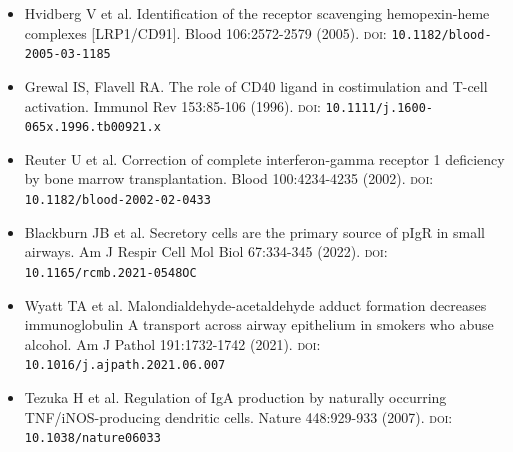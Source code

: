\documentclass[10pt]{article}
\begin{document}
{\begin{itemize}[leftmargin=2.2em,itemsep=1pt,topsep=2pt]
\item[12.] Hvidberg V et al. Identification of the receptor scavenging hemopexin-heme complexes [LRP1/CD91]. Blood 106:2572-2579 (2005). \textsc{doi}: \texttt{10.1182/blood-2005-03-1185}
\item[13.] Grewal IS, Flavell RA. The role of CD40 ligand in costimulation and T-cell activation. Immunol Rev 153:85-106 (1996). \textsc{doi}: \texttt{10.1111/j.1600-065x.1996.tb00921.x}
\item[14.] Reuter U et al. Correction of complete interferon-gamma receptor 1 deficiency by bone marrow transplantation. Blood 100:4234-4235 (2002). \textsc{doi}: \texttt{10.1182/blood-2002-02-0433}
\item[15.] Blackburn JB et al. Secretory cells are the primary source of pIgR in small airways. Am J Respir Cell Mol Biol 67:334-345 (2022). \textsc{doi}: \texttt{10.1165/rcmb.2021-0548OC}
\item[16.] Wyatt TA et al. Malondialdehyde-acetaldehyde adduct formation decreases immunoglobulin A transport across airway epithelium in smokers who abuse alcohol. Am J Pathol 191:1732-1742 (2021). \textsc{doi}: \texttt{10.1016/j.ajpath.2021.06.007}
\item[17.] Tezuka H et al. Regulation of IgA production by naturally occurring TNF/iNOS-producing dendritic cells. Nature 448:929-933 (2007). \textsc{doi}: \texttt{10.1038/nature06033}
\end{itemize}
}
\end{document}
